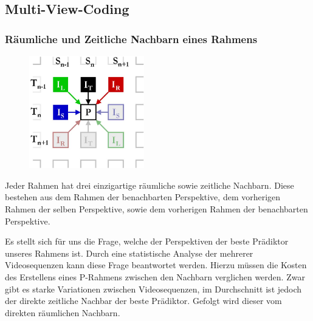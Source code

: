 \subsection{Multi-View-Coding}\label{subsec:mvc}

\subsubsection{Räumliche und Zeitliche Nachbarn eines Rahmens}
\begin{figure}
    \includegraphics[width=5cm]{../img/prediction}
\end{figure}

Jeder Rahmen hat drei einzigartige räumliche sowie zeitliche Nachbarn.
Diese bestehen aus dem Rahmen der benachbarten Perspektive, dem vorherigen Rahmen der selben Perspektive, sowie
dem vorherigen Rahmen der benachbarten Perspektive.

\noindent\newline Es stellt sich für uns die Frage, welche der Perspektiven der beste Prädiktor unseres Rahmens ist.
Durch eine statistische Analyse der mehrerer Videosequenzen kann diese Frage beantwortet werden.
Hierzu müssen die Kosten des Erstellens eines P-Rahmens zwischen den Nachbarn verglichen werden.
Zwar gibt es starke Variationen zwischen Videosequenzen, im Durchschnitt ist jedoch der direkte zeitliche Nachbar
der beste Prädiktor.
Gefolgt wird dieser vom direkten räumlichen Nachbarn.
